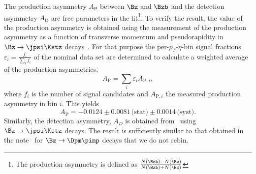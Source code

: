 The production asymmetry $A_{\mathrm{P}}$ between $\Bz$ and $\Bzb$ and the detection
asymmetry $A_{\mathrm{D}}$ are free parameters in the fit\footnote{The production
asymmetry is defined as $\frac{N(\Bzb)-N(\Bz)}{N(\Bzb)+N(\Bz)}$}. To verify the result, the value of the production asymmetry is obtained using the \lhcb measurement of the production asymmetry as a function of transverse momentum and pseudorapidity in $\Bz\to\jpsi\Kstz$ decays~\cite{LHCb-PAPER-2014-042}. For that purpose the per-$p_T$-$\eta$-bin signal fractions $\varepsilon_i = \frac{f_i}{\sum_i f_i}$ of the nominal data set are
determined to calculate a weighted average of the production asymmetries,
%
\begin{equation}
	A_{\mathrm{P}} = \sum_i \varepsilon_i A_{\mathrm{P},i},
\end{equation}
%
where $f_i$ is the number of signal candidates and $A_{\mathrm{P},i}$ the
measured production asymmetry in bin $i$. This yields
%
\begin{equation}
        \label{eq:prodAsymm}
	A_{\mathrm{P}} =  -0.0124 \pm 0.0081\,\text{(stat)} \pm 0.0014\, \text{(syst)}.
\end{equation}
%
Similarly, the detection asymmetry, $A_{D}$ is obtained from~\cite{LHCb-PAPER-2014-042}
using $\Bz\to\jpsi\Kstz$ decays. The result is sufficiently similar to that obtained in
the note~\cite{LHCb-PAPER-2014-042} for $\Bz\to\Dpm\pimp$ decays that we do not rebin.

